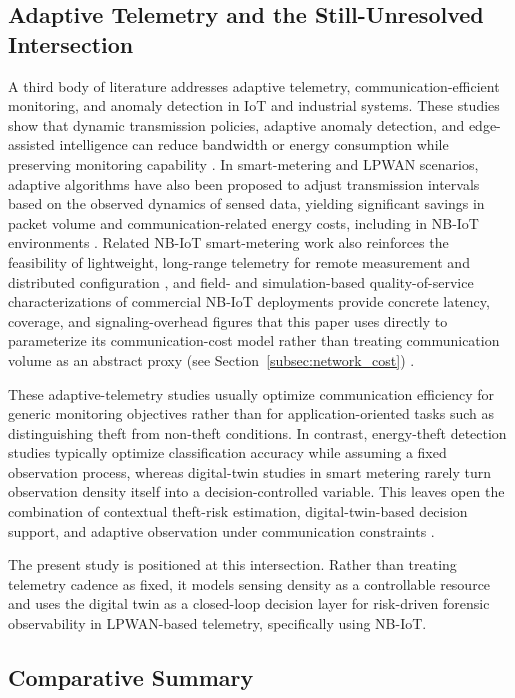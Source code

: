 \documentclass{ieeeaccess}
\begin{document}
\subsection{Adaptive Telemetry and the Still-Unresolved Intersection}
A third body of literature addresses adaptive telemetry, communication-efficient monitoring, and anomaly detection in IoT and industrial systems. These studies show that dynamic transmission policies, adaptive anomaly detection, and edge-assisted intelligence can reduce bandwidth or energy consumption while preserving monitoring capability \cite{b26, b27, b28}. In smart-metering and LPWAN scenarios, adaptive algorithms have also been proposed to adjust transmission intervals based on the observed dynamics of sensed data, yielding significant savings in packet volume and communication-related energy costs, including in NB-IoT environments \cite{b29}. Related NB-IoT smart-metering work also reinforces the feasibility of lightweight, long-range telemetry for remote measurement and distributed configuration \cite{b30, b31}, and field- and simulation-based quality-of-service characterizations of commercial NB-IoT deployments provide concrete latency, coverage, and signaling-overhead figures that this paper uses directly to parameterize its communication-cost model rather than treating communication volume as an abstract proxy (see Section~\ref{subsec:network_cost}) \cite{b32,b33,b34,b35}.

These adaptive-telemetry studies usually optimize communication efficiency for generic monitoring objectives rather than for application-oriented tasks such as distinguishing theft from non-theft conditions. In contrast, energy-theft detection studies typically optimize classification accuracy while assuming a fixed observation process, whereas digital-twin studies in smart metering rarely turn observation density itself into a decision-controlled variable. This leaves open the combination of contextual theft-risk estimation, digital-twin-based decision support, and adaptive observation under communication constraints \cite{b6, b14, b22, b29}.

The present study is positioned at this intersection. Rather than treating telemetry cadence as fixed, it models sensing density as a controllable resource and uses the digital twin as a closed-loop decision layer for risk-driven forensic observability in LPWAN-based telemetry, specifically using NB-IoT.

\subsection{Comparative Summary}
\end{document}
